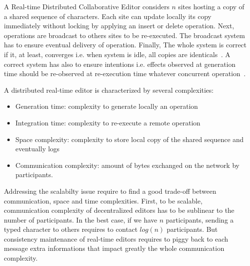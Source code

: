 A Real-time Distributed Collaborative Editor considers $n$ sites
hosting a copy of a shared sequence of characters. Each site can
update locally its copy immediately without locking by applying an
insert or delete operation. Next, operations are broadcast to others
sites to be re-executed. The broadcast system has to ensure eventual
delivery of operation. Finally, The whole system is correct if it, at
least, converges i.e. when system is idle, all copies are
identicals~\cite{bailis2013eventual}. A correct system has also to
ensure intentions i.e. effects observed at generation time should be
re-observed at re-execution time whatever concurrent
operation~\cite{sun1998achieving}.

A distributed real-time editor is characterized by several
complexities:
\begin{itemize}
\item Generation time: complexity to generate locally an operation
\item Integration time: complexity to re-execute a remote operation
\item Space complexity: complexity to store local copy of the shared
  sequence and eventually logs
\item Communication complexity: amount of bytes exchanged on the
  network by participants. 
\end{itemize}

Addressing the scalabilty issue require to find a good trade-off
between communication, space and time complexities. First, to be
scalable, communication complexity of decentralized editors has to be
sublinear to the number of participants. In the best case, if we have
$n$ participants, sending a typed character to others requires to
contact $log(n)$ participants. But consistency maintenance of
real-time editors requires to piggy back to each message extra
informations that impact greatly the whole communication complexity.

